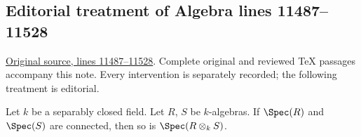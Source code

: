 \subsection{Editorial treatment of Algebra lines 11487--11528}

\hypertarget{algebra-context-149}{}

\noindent\href{https://github.com/stacks/stacks-project/blob/a04446e57ec1fbc252a871afcec7752fb2807b14/algebra.tex\#L11487}{Original source, lines 11487--11528}. Complete original and reviewed TeX passages accompany this note. Every intervention is separately recorded; the following treatment is editorial.


\begin{lemma}
\label{editorial-source-lemma-separably-closed-connected}
Let $k$ be a separably closed field.
Let $R$, $S$ be $k$-algebras. If $\Spec(R)$ and
$\Spec(S)$ are connected, then so is
$\Spec(R \otimes_k S)$.
\end{lemma}

